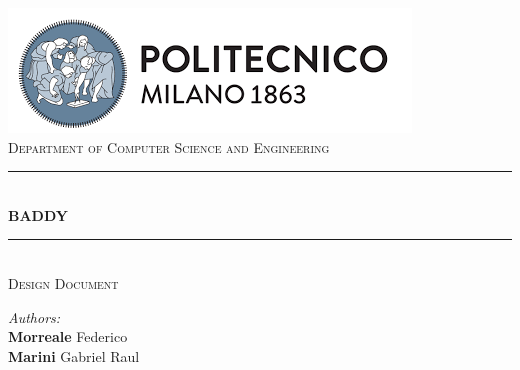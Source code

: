 \documentclass[a4paper, hidelinks, 12pt]{report}
\begin{document}
    \begin{titlepage}
        \centering
        \vspace*{0.7 cm}
        \includegraphics[scale = 0.85]{assets/polimi.png}\\[1.6 cm]
        \textsc{\large Department of Computer Science and Engineering}\\[1.8 cm]

        \rule{\linewidth}{0.2 mm} \\[0.4 cm]
        { \huge \bfseries BADDY}\\
        \rule{\linewidth}{0.2 mm} \\[1.5 cm]

        \textsc{\Large Design Document}\\[1 cm]


        \begin{minipage}{1\textwidth}
            \begin{flushleft}
                \large
                \emph{Authors:}\\
                \textbf{Morreale} Federico \\
                \textbf{Marini} Gabriel Raul \\
            \end{flushleft}
        \end{minipage}
        \newline
        \newline
        \vfill
    \end{titlepage}

    \tableofcontents
    \newpage
    \setcounter{page}{1}

    \newpage
    
    
\end{document}
